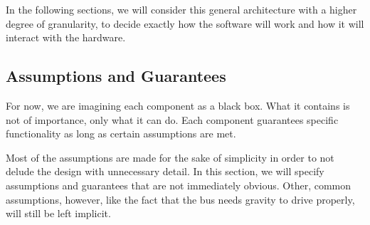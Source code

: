 In the following sections, we will consider this general architecture with a higher degree of granularity, to decide exactly how the software will work and how it will interact with the hardware. 


\subsection{Assumptions and Guarantees}
For now, we are imagining each component as a black box. What it contains is not of importance, only what it can do. Each component guarantees specific functionality as long as certain assumptions are met.

Most of the assumptions are made for the sake of simplicity in order to not delude the design with unnecessary detail. In this section, we will specify assumptions and guarantees that are not immediately obvious. Other, common assumptions, however, like the fact that the bus needs gravity to drive properly, will still be left implicit. 

